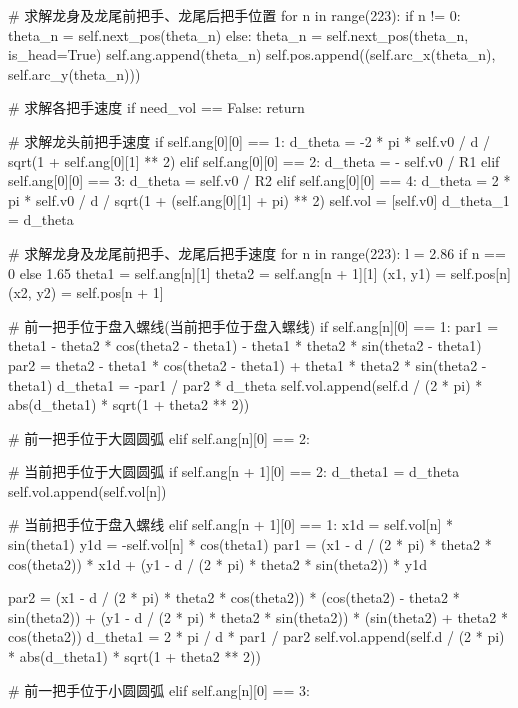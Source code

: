 \documentclass[withoutpreface,bwprint]{cumcmthesis}
\begin{document}
\begin{CodeText}
      # 求解龙身及龙尾前把手、龙尾后把手位置
      for n in range(223):
           if n != 0:
              theta_n = self.next_pos(theta_n)
           else:
              theta_n = self.next_pos(theta_n, is_head=True)
           self.ang.append(theta_n)
           self.pos.append((self.arc_x(theta_n), self.arc_y(theta_n)))


# 求解各把手速度
if need_vol == False:
   return

# 求解龙头前把手速度
if self.ang[0][0] == 1:
   d_theta = -2 * pi * self.v0 / d / sqrt(1 + self.ang[0][1] ** 2)
elif self.ang[0][0] == 2:
   d_theta = - self.v0 / R1
elif self.ang[0][0] == 3:
   d_theta = self.v0 / R2
elif self.ang[0][0] == 4:
   d_theta = 2 * pi * self.v0 / d / sqrt(1 + (self.ang[0][1] + pi) ** 2)
self.vol = [self.v0]
d_theta_1 = d_theta

# 求解龙身及龙尾前把手、龙尾后把手速度
for n in range(223):
   l = 2.86 if n == 0 else 1.65
   theta1 = self.ang[n][1]
   theta2 = self.ang[n + 1][1]
   (x1, y1) = self.pos[n]
   (x2, y2) = self.pos[n + 1]

   # 前一把手位于盘入螺线(当前把手位于盘入螺线)
   if self.ang[n][0] == 1:
      par1 = theta1 - theta2 * cos(theta2 - theta1) - theta1 * theta2 * sin(theta2 -
                  theta1)
      par2 = theta2 - theta1 * cos(theta2 - theta1) + theta1 * theta2 * sin(theta2 -
                  theta1)
      d_theta1 = -par1 / par2 * d_theta
      self.vol.append(self.d / (2 * pi) * abs(d_theta1) * sqrt(1 + theta2 ** 2))

   # 前一把手位于大圆圆弧
   elif self.ang[n][0] == 2:

      # 当前把手位于大圆圆弧
      if self.ang[n + 1][0] == 2:
            d_theta1 = d_theta
            self.vol.append(self.vol[n])

      # 当前把手位于盘入螺线
      elif self.ang[n + 1][0] == 1:
            x1d = self.vol[n] * sin(theta1)
            y1d = -self.vol[n] * cos(theta1)
            par1 = (x1 - d / (2 * pi) * theta2 * cos(theta2)) * x1d + (y1 - d / (2 * pi)
                      * theta2 * sin(theta2)) * y1d

      par2 = (x1 - d / (2 * pi) * theta2 * cos(theta2)) * (cos(theta2) - theta2 *
                 sin(theta2)) + (y1 - d / (2 * pi) * theta2 * sin(theta2)) * (sin(theta2)
                 + theta2 * cos(theta2))
      d_theta1 = 2 * pi / d * par1 / par2
      self.vol.append(self.d / (2 * pi) * abs(d_theta1) * sqrt(1 + theta2 ** 2))

# 前一把手位于小圆圆弧
elif self.ang[n][0] == 3:


\end{CodeText}
\end{document}
